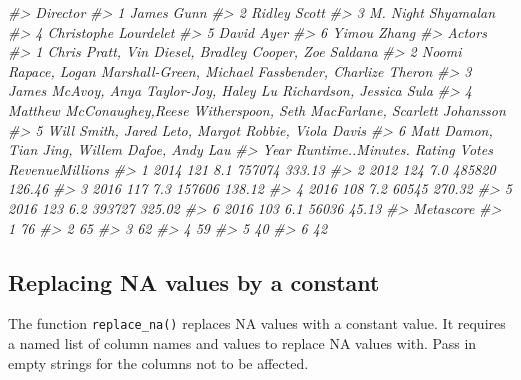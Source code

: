 \documentclass[
]{book}
\newenvironment{Shaded}{\begin{snugshade}}{\end{snugshade}}
\newcommand{\CommentTok}[1]{\textcolor[rgb]{0.56,0.35,0.01}{\textit{#1}}}
\begin{document}
\begin{Shaded}
\begin{Highlighting}[]
\CommentTok{\#\textgreater{}               Director}
\CommentTok{\#\textgreater{} 1           James Gunn}
\CommentTok{\#\textgreater{} 2         Ridley Scott}
\CommentTok{\#\textgreater{} 3   M. Night Shyamalan}
\CommentTok{\#\textgreater{} 4 Christophe Lourdelet}
\CommentTok{\#\textgreater{} 5           David Ayer}
\CommentTok{\#\textgreater{} 6          Yimou Zhang}
\CommentTok{\#\textgreater{}                                                                       Actors}
\CommentTok{\#\textgreater{} 1                       Chris Pratt, Vin Diesel, Bradley Cooper, Zoe Saldana}
\CommentTok{\#\textgreater{} 2    Noomi Rapace, Logan Marshall{-}Green, Michael Fassbender, Charlize Theron}
\CommentTok{\#\textgreater{} 3           James McAvoy, Anya Taylor{-}Joy, Haley Lu Richardson, Jessica Sula}
\CommentTok{\#\textgreater{} 4 Matthew McConaughey,Reese Witherspoon, Seth MacFarlane, Scarlett Johansson}
\CommentTok{\#\textgreater{} 5                         Will Smith, Jared Leto, Margot Robbie, Viola Davis}
\CommentTok{\#\textgreater{} 6                              Matt Damon, Tian Jing, Willem Dafoe, Andy Lau}
\CommentTok{\#\textgreater{}   Year Runtime..Minutes. Rating  Votes RevenueMillions}
\CommentTok{\#\textgreater{} 1 2014               121    8.1 757074          333.13}
\CommentTok{\#\textgreater{} 2 2012               124    7.0 485820          126.46}
\CommentTok{\#\textgreater{} 3 2016               117    7.3 157606          138.12}
\CommentTok{\#\textgreater{} 4 2016               108    7.2  60545          270.32}
\CommentTok{\#\textgreater{} 5 2016               123    6.2 393727          325.02}
\CommentTok{\#\textgreater{} 6 2016               103    6.1  56036           45.13}
\CommentTok{\#\textgreater{}   Metascore}
\CommentTok{\#\textgreater{} 1        76}
\CommentTok{\#\textgreater{} 2        65}
\CommentTok{\#\textgreater{} 3        62}
\CommentTok{\#\textgreater{} 4        59}
\CommentTok{\#\textgreater{} 5        40}
\CommentTok{\#\textgreater{} 6        42}
\end{Highlighting}
\end{Shaded}

\hypertarget{replacing-na-values-by-a-constant}{%
\subsection{Replacing NA values by a constant}\label{replacing-na-values-by-a-constant}}

The function \texttt{replace\_na()} replaces NA values with a constant value. It requires a named list of column names and values to replace NA values with. Pass in empty strings for the columns not to be affected.
\end{document}
